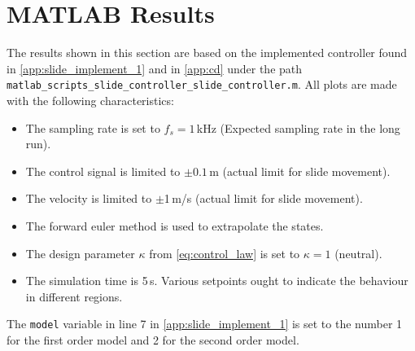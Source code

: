 \section{MATLAB Results}\label{sec:matlab-results-slide-safety}
The results shown in this section are based on the implemented controller found in \autoref{app:slide_implement_1} and in \autoref{app:cd} under the path \texttt{matlab\_scripts\_slide\_controller\_slide\_controller.m}. All plots are made with the following characteristics:
\begin{itemize}
\item The sampling rate is set to $f_s = 1\,$kHz (Expected sampling rate in the long run).
\item The control signal is limited to $\pm 0.1$\,m (actual limit for slide movement).
\item The velocity is limited to $\pm$1\,m/s (actual limit for slide movement).
\item The forward euler method is used to extrapolate the states.
\item The design parameter $\kappa$ from \autoref{eq:control_law} is set to $\kappa=1$ (neutral).
\item The simulation time is 5\,s. Various setpoints ought to indicate the behaviour in different regions.
\end{itemize}
The \texttt{model} variable in line 7 in \autoref{app:slide_implement_1} is set to the number 1 for the first order model and 2 for the second order model. 
\vspace{-0.3cm}
